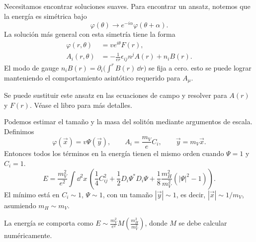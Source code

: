\documentclass[11pt,a4paper]{article}
\begin{document}
Necesitamos encontrar soluciones suaves. Para encontrar un ansatz,
notemos que la energía es simétrica bajo
\[
\varphi(\theta)\to e^{-i\alpha}\varphi(\theta+\alpha).
\]
La solución más general con esta simetría tiene la forma
\begin{align*}
\varphi(r,\theta)&=v e^{i\theta}F(r),\\
A_i(r,\theta)&=-\frac{1}{er}\epsilon_{ij}n^j A(r)+n_iB(r).
\end{align*}
El modo de gauge $n_iB(r)=\partial_i\bigl(\int^r B(r)\,\dd r\bigr)$
se fija a cero.
esto se puede lograr manteniendo el comportamiento asintótico requerido para $A_\mu$.

Se puede sustituir este ansatz en las ecuaciones de campo y resolver para
$A(r)$ y $F(r)$. Véase el libro para más detalles.

Podemos estimar el tamaño y la masa del solitón mediante argumentos de escala.
Definimos
\[
\varphi(\vec{x})=v\Psi(\vec{y}),\qquad
A_i=\frac{m_V}{e}C_i,\qquad \vec{y}=m_V\vec{x}.
\]
Entonces todos los términos en la energía tienen el mismo orden cuando
$\Psi=1$ y $C_i=1$.
\[
E=\frac{m_V^2}{e^2}\int\dd^2 x\,
   \left(\frac14 C_{ij}^2+\frac12 D_i\Psi^*D_i\Psi
         +\frac18\frac{m_H^2}{m_V^2}(|\Psi|^2-1)\right).
\]
El mínimo está en $C_i\sim1$, $\Psi\sim1$, con un tamaño $|\vec{y}|\sim1$,
es decir, $|\vec{x}|\sim1/m_V$, asumiendo $m_H\sim m_V$.

La energía se comporta como
$E\sim\frac{m_V^2}{e^2}M\left(\frac{m_H^2}{m_V^2}\right)$,
donde $M$ se debe calcular numéricamente.
\end{document}

